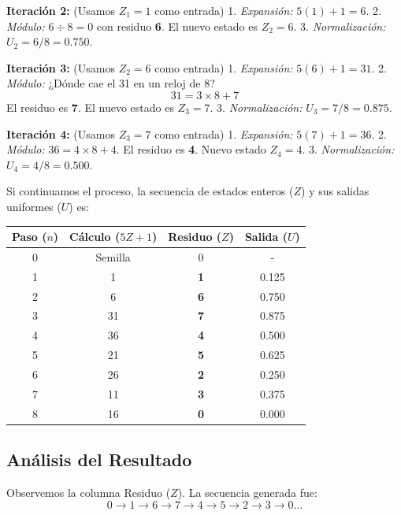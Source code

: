 \documentclass[11pt, letterpaper]{article}
\begin{document}
\textbf{Iteración 2:} (Usamos $Z_1=1$ como entrada)
1. \textit{Expansión:} $5(1) + 1 = 6$.
2. \textit{Módulo:} $6 \div 8 = 0$ con residuo \textbf{6}. El nuevo estado es $Z_2 = 6$.
3. \textit{Normalización:} $U_2 = 6 / 8 = \mathbf{0.750}$.

\textbf{Iteración 3:} (Usamos $Z_2=6$ como entrada)
1. \textit{Expansión:} $5(6) + 1 = 31$.
2. \textit{Módulo:} ¿Dónde cae el 31 en un reloj de 8?
   $$ 31 = 3 \times 8 + 7 $$
   El residuo es \textbf{7}. El nuevo estado es $Z_3 = 7$.
3. \textit{Normalización:} $U_3 = 7 / 8 = \mathbf{0.875}$.

\textbf{Iteración 4:} (Usamos $Z_3=7$ como entrada)
1. \textit{Expansión:} $5(7) + 1 = 36$.
2. \textit{Módulo:} $36 = 4 \times 8 + 4$. El residuo es \textbf{4}. Nuevo estado $Z_4 = 4$.
3. \textit{Normalización:} $U_4 = 4 / 8 = \mathbf{0.500}$.

\begin{ejemplobox}
Si continuamos el proceso, la secuencia de estados enteros ($Z$) y sus salidas uniformes ($U$) es:
\begin{center}
\begin{tabular}{c | c | c | c}
\textbf{Paso ($n$)} & \textbf{Cálculo} ($5Z+1$) & \textbf{Residuo ($Z$)} & \textbf{Salida ($U$)} \\ \hline
0 & Semilla & 0 & - \\
1 & 1 & \textbf{1} & 0.125 \\
2 & 6 & \textbf{6} & 0.750 \\
3 & 31 & \textbf{7} & 0.875 \\
4 & 36 & \textbf{4} & 0.500 \\
5 & 21 & \textbf{5} & 0.625 \\
6 & 26 & \textbf{2} & 0.250 \\
7 & 11 & \textbf{3} & 0.375 \\
8 & 16 & \textbf{0} & 0.000 \\
\end{tabular}
\end{center}
\end{ejemplobox}

\subsection{Análisis del Resultado}
Observemos la columna Residuo ($Z$). La secuencia generada fue:
$$ 0 \rightarrow 1 \rightarrow 6 \rightarrow 7 \rightarrow 4 \rightarrow 5 \rightarrow 2 \rightarrow 3 \rightarrow 0 \dots $$
\end{document}
